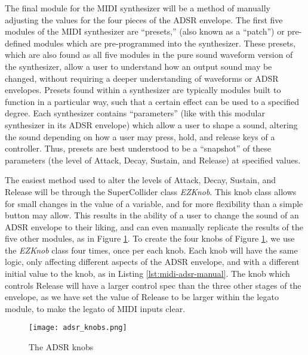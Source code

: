 The final module for the MIDI synthesizer will be a method of manually adjusting the values for the four pieces of the ADSR envelope. The first five modules of the MIDI synthesizer are ``presets,'' (also known as a ``patch'') or pre-defined modules which are pre-programmed into the synthesizer. These presets, which are also found as all five modules in the pure sound waveform version of the synthesizer, allow a user to understand how an output sound may be changed, without requiring a deeper understanding of waveforms or ADSR envelopes. Presets found within a synthesizer are typically modules built to function in a particular way, such that a certain effect can be used to a specified degree. Each synthesizer contains ``parameters'' (like with this modular synthesizer in its ADSR envelope) which allow a user to shape a sound, altering the sound depending on how a user may press, hold, and release keys of a controller. Thus, presets are best understood to be a ``snapshot'' of these parameters (the level of Attack, Decay, Sustain, and Release) at specified values.

The easiest method used to alter the levels of Attack, Decay, Sustain, and Release will be through the SuperCollider class \textit{EZKnob}. This knob class allows for small changes in the value of a variable, and for more flexibility than a simple button may allow. This results in the ability of a user to change the sound of an ADSR envelope to their liking, and can even manually replicate the results of the five other modules, as in Figure \ref{fig:adsr-knobs}. To create the four knobs of Figure \ref{fig:adsr-knobs}, we use the \textit{EZKnob} class four times, once per each knob. Each knob will have the same logic, only affecting different aspects of the ADSR envelope, and with a different initial value to the knob, as in Listing \ref{lst:midi-adsr-manual}. The knob which controls Release will have a larger control spec than the three other stages of the envelope, as we have set the value of Release to be larger within the legato module, to make the legato of MIDI inputs clear.

\begin{figure}[h]
  \centering
  \texttt{[image: adsr\_knobs.png]}
  \caption{The ADSR knobs}
  \label{fig:adsr-knobs}
\end{figure}


